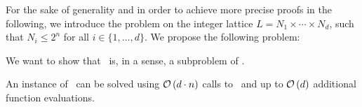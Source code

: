 For the sake of generality and in order to achieve more precise proofs in the following, we introduce the problem on the integer lattice $L = N_1 \times \cdots \times N_d$, such that $N_i \leq 2^n$ for all $i \in \{1, \dots, d\}$. We propose the following problem:

We want to show that \Tarskistar\ is, in a sense, a subproblem of \Tarski.
\begin{claim}
	An instance of \Tarski\ can be solved using $\mathcal{O}\left(d\cdot n\right)$ calls to \Tarskistar\ and up to $\mathcal{O}\left(d\right)$ additional function evaluations.
\end{claim}

